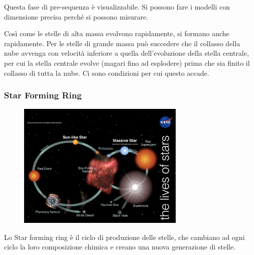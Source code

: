 Questa fase di pre-sequenza è visualizzabile. Si possono fare i modelli con dimensione precisa perché si possono misurare.

Così come le stelle di alta massa evolvono rapidamente, si formano anche rapidamente. Per le stelle di grande massa può succedere che il collasso della nube avvenga con velocità inferiore a quella dell'evoluzione della stella centrale, per cui la stella centrale evolve (magari fino ad esplodere) prima che sia finito il collasso di tutta la nube. Ci sono condizioni per cui questo accade.

\subsubsection{Star Forming Ring}

\begin{figure}[H]
    \centering
    \includegraphics[width=8cm]{lezione 28 novembre/immaginanasa.png}
    \label{lezione 28 novembre/immaginanasa.png}
\end{figure}

Lo Star forming ring è il ciclo di produzione delle stelle, che cambiano ad ogni ciclo la loro composizione chimica e creano una nuova generazione di stelle.